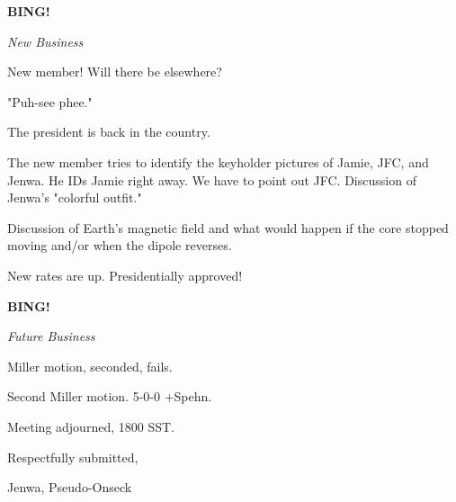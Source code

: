 \documentclass[12pt]{article}
\newcommand{\bing}{{\bf BING!} }
\newcommand{\goto}[1]{\bing \vskip 12pt \centerline{{\em{#1}}}}
\begin{document}
\goto{New Business}

New member! Will there be elsewhere?

"Puh-see phee."

The president is back in the country.

The new member tries to identify the keyholder pictures of Jamie, JFC, and Jenwa. He IDs Jamie right away. We have to point out JFC. Discussion of Jenwa's "colorful outfit."

Discussion of Earth's magnetic field and what would happen if the core stopped moving and/or when the dipole reverses.

New rates are up. Presidentially approved!

\goto{Future Business}

Miller motion, seconded, fails.

Second Miller motion. 5-0-0 +Spehn.

\vspace{12pt}

\noindent
Meeting adjourned, 1800 SST.

\vspace{18pt}

\centerline{Respectfully submitted,}
\centerline{Jenwa, Pseudo-Onseck}
\end{document}
